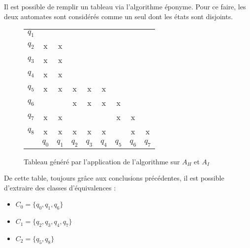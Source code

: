 Il est possible de remplir un tableau via l'algorithme éponyme. Pour ce faire, les deux automates sont considérés comme un seul dont les états sont disjoints.

\begin{figure}[H]
 \centering
 \begin{tabular}{ccccccccc}
	 \cline{2-2}
	 \multicolumn{1}{c|}{$q_1$}&\multicolumn{1}{c|}{} &&&&&&&\\
	 \cline{2-3}
	 \multicolumn{1}{c|}{$q_2$}&\multicolumn{1}{c|}{x} &\multicolumn{1}{c|}{x}&&&&&&\\
	 \cline{2-4}
	 \multicolumn{1}{c|}{$q_3$}&\multicolumn{1}{c|}{x}&\multicolumn{1}{c|}{x}&\multicolumn{1}{c|}{}&&&&&\\
	 \cline{2-5}
	 \multicolumn{1}{c|}{$q_4$}&\multicolumn{1}{c|}{x}&\multicolumn{1}{c|}{x}&\multicolumn{1}{c|}{}&\multicolumn{1}{c|}{}&&&&\\
	 \cline{2-6}
	 \multicolumn{1}{c|}{$q_5$}&\multicolumn{1}{c|}{x}&\multicolumn{1}{c|}{x}&\multicolumn{1}{c|}{x}&\multicolumn{1}{c|}{x}&\multicolumn{1}{c|}{x}&&&\\
	 \cline{2-7}
	 \multicolumn{1}{c|}{$q_6$}&\multicolumn{1}{c|}{}&\multicolumn{1}{c|}{}&\multicolumn{1}{c|}{x}&\multicolumn{1}{c|}{x}&\multicolumn{1}{c|}{x}&\multicolumn{1}{c|}{x}&&\\
	 \cline{2-8}
	 \multicolumn{1}{c|}{$q_7$}&\multicolumn{1}{c|}{x}&\multicolumn{1}{c|}{x}&\multicolumn{1}{c|}{}&\multicolumn{1}{c|}{}&\multicolumn{1}{c|}{}&\multicolumn{1}{c|}{x}&\multicolumn{1}{c|}{x}&\\
	 \cline{2-9}
	 \multicolumn{1}{c|}{$q_8$}&\multicolumn{1}{c|}{x}&\multicolumn{1}{c|}{x}&\multicolumn{1}{c|}{x}&\multicolumn{1}{c|}{x}&\multicolumn{1}{c|}{x}&\multicolumn{1}{c|}{}&\multicolumn{1}{c|}{x}&\multicolumn{1}{c|}{x}\\
	 \cline{2-9}
	 \multicolumn{1}{c}{} & $q_0$& $q_1$ & $q_2$ & $q_3$ & $q_4$ & $q_5$ & $q_6$ & $q_7$\\

 \end{tabular}
 \caption{Tableau généré par l'application de l'algorithme sur $A_H$ et $A_I$}\label{fig:tahi}
\end{figure}

De cette table, toujours grâce aux conclusions précédentes, il est possible d'extraire des classes d'équivalences :
\begin{itemize}
 \item $C_0 = \{q_0, q_1, q_6\}$
 \item $C_1 = \{q_2, q_3, q_4, q_7\}$
 \item $C_2 = \{q_5, q_8\}$
\end{itemize}

